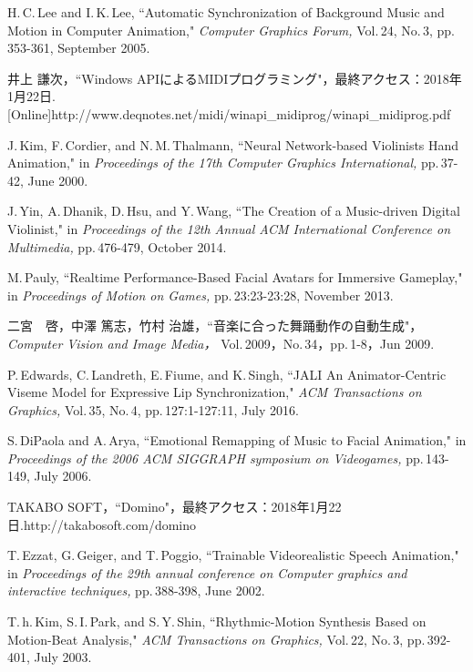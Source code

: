 \begin{thebibliography}{55}
H.\,C.\,Lee and I.\,K.\,Lee,
 ``Automatic Synchronization of Background Music and Motion in Computer Animation,"
 \textit{Computer Graphics Forum,} Vol.\,24, No.\,3, pp.\,353-361, September 2005.

井上 謙次，``Windows APIによるMIDIプログラミング"，最終アクセス：2018年1月22日.\,
[Online]http://www.deqnotes.net/midi/winapi\_midiprog/winapi\_midiprog.pdf

J.\,Kim, F.\,Cordier, and N.\,M.\,Thalmann,
 ``Neural Network-based Violinists Hand Animation,"
 in \textit{Proceedings of the 17th Computer Graphics International,} pp.\,37-42, June 2000.

J.\,Yin, A.\,Dhanik, D.\,Hsu, and Y.\,Wang,
 ``The Creation of a Music-driven Digital Violinist,"
 in \textit{Proceedings of the 12th Annual ACM International Conference on Multimedia,} pp.\,476-479, October 2014.
 
M.\,Pauly,
 ``Realtime Performance-Based Facial Avatars for Immersive Gameplay," in \textit{Proceedings of Motion on Games,} pp.\,23:23-23:28, November 2013.

二宮　啓，中澤 篤志，竹村 治雄，``音楽に合った舞踊動作の自動生成"，
\textit{Computer Vision and Image Media，} Vol.\,2009，No.\,34，pp.\,1-8，Jun 2009.
 
P.\,Edwards, C.\,Landreth, E.\,Fiume, and K.\,Singh,
 ``JALI An Animator-Centric Viseme Model for Expressive Lip Synchronization,"
 \textit{ACM Transactions on Graphics,} Vol.\,35, No.\,4, pp.\,127:1-127:11, July 2016.

S.\,DiPaola and A.\,Arya,
 ``Emotional Remapping of Music to Facial Animation,"
 in \textit{Proceedings of the 2006 ACM SIGGRAPH symposium on Videogames,} pp.\,143-149, July 2006.
  
TAKABO SOFT，``Domino"，最終アクセス：2018年1月22日.\newline
[Online]http://takabosoft.com/domino

T.\,Ezzat, G.\,Geiger, and T.\,Poggio,
 ``Trainable Videorealistic Speech Animation,"
 in \textit{Proceedings of the 29th annual conference on Computer graphics and interactive techniques,} pp.\,388-398, June 2002.

T.\,h.\,Kim, S.\,I.\,Park, and S.\,Y.\,Shin,
 ``Rhythmic-Motion Synthesis Based on Motion-Beat Analysis,"
\textit{ACM Transactions on Graphics,} Vol.\,22, No.\,3, pp.\,392-401, July 2003.


\end{thebibliography}
